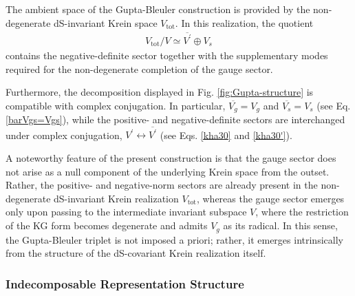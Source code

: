 \documentclass[aps,twocolumn,nofootinbib]{revtex4}
\begin{document}
The ambient space of the Gupta-Bleuler construction is provided by the non-degenerate dS-invariant Krein space $V_{\text{tot}}$. In this realization, the quotient
\begin{align}
    V_{\text{tot}}/V \simeq \overline{V^\prime} \oplus V_s
\end{align}
contains the negative-definite sector together with the supplementary modes required for the non-degenerate completion of the gauge sector.

Furthermore, the decomposition displayed in Fig. \ref{fig:Gupta-structure} is compatible with complex conjugation. In particular, $\overline{V_g}=V_g$ and $\overline{V_s}=V_s$ (see Eq. \eqref{barVgs=Vgs}), while the positive- and negative-definite sectors are interchanged under complex conjugation, $V^\prime \longleftrightarrow \overline{V^\prime}$ (see Eqs. \eqref{kha30} and \eqref{kha30'}).

A noteworthy feature of the present construction is that the gauge sector does not arise as a null component of the underlying Krein space from the outset. Rather, the positive- and negative-norm sectors are already present in the non-degenerate dS-invariant Krein realization $V_{\mathrm{tot}}$, whereas the gauge sector emerges only upon passing to the intermediate invariant subspace $V$, where the restriction of the KG form becomes degenerate and admits $V_g$ as its radical. In this sense, the Gupta-Bleuler triplet is not imposed a priori; rather, it emerges intrinsically from the structure of the dS-covariant Krein realization itself.


\subsubsection{Indecomposable Representation Structure}\label{Sec. IndeRepSpac}
\end{document}
